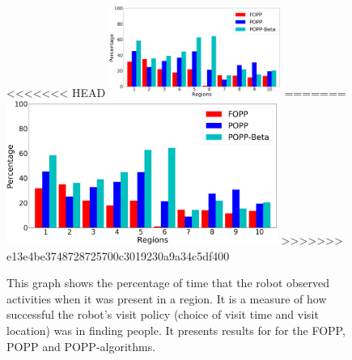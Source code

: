 \begin{figure}[t!]
	\centering
<<<<<<< HEAD
	\includegraphics[width=0.5\textwidth]{./figures/exploration_percentage_region.png}
=======
	\includegraphics[width=0.79\textwidth]{./figures/exploration_percentage_region.png}
>>>>>>> e13e4be3748728725700c3019230a9a34c5df400
	\caption{This graph shows the percentage of time that the robot observed activities when it was present in a region. It is a measure of how successful the robot's visit policy (choice of visit time and visit location) was in finding people. It presents results for for the FOPP, POPP and POPP-algorithms. %
	}
	\label{fig:exploration_percentage_region}
\end{figure}



